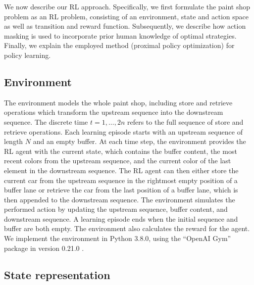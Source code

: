 \documentclass[11pt]{elsarticle}
\begin{document}
We now describe our RL approach. Specifically, we first formulate the paint shop problem as an RL problem, consisting of an environment, state and action space as well as transition and reward function. Subsequently, we describe how action masking is used to incorporate prior human knowledge of optimal strategies. Finally, we explain the employed method (proximal policy optimization) for policy learning.

\subsection{Environment}

The environment models the whole paint shop, including store and retrieve operations which transform the upstream sequence into the downstream sequence. The discrete time $t=1,\dots,2n$ refers to the full sequence of store and retrieve operations. Each learning episode starts with an upstream sequence of length $N$ and an empty buffer. At each time step, the environment provides the RL agent with the current state, which contains the buffer content, the most recent colors from the upstream sequence, and the current color of the last element in the downstream sequence. The RL agent can then either store the current car from the upstream sequence in the rightmost empty position of a buffer lane or retrieve the car from the last position of a buffer lane, which is then appended to the downstream sequence. The environment simulates the performed action by updating the upstream sequence, buffer content, and downstream sequence. A learning episode ends when the initial sequence and buffer are both empty. The environment also calculates the reward for the agent. We implement the environment in Python 3.8.0, using the ``OpenAI Gym'' package in version 0.21.0 \citep{brockman_openai_2016}.

\subsection{State representation}
\end{document}
